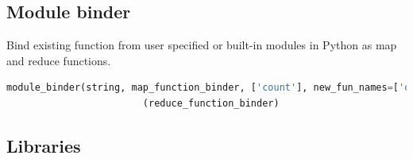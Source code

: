\documentclass[paper=128mm:96mm, fontsize=11pt, pagesize, parskip=half-,]{scrartcl}
\theoremstyle{definition}
\newcommand*{\newslide}{\clearpage}
\begin{document}
\subsection{Module binder}
Bind existing function from user specified or built-in modules in Python as map and reduce functions.
\vspace*{1mm}
\begin{lstlisting}[language=Python, basicstyle=\ttfamily\tiny, numbers=none]
	module_binder(string, map_function_binder, ['count'], new_fun_names=['occurrences'])
	                    (reduce_function_binder)
\end{lstlisting}
\newslide

\subsection{Libraries}
\end{document}
